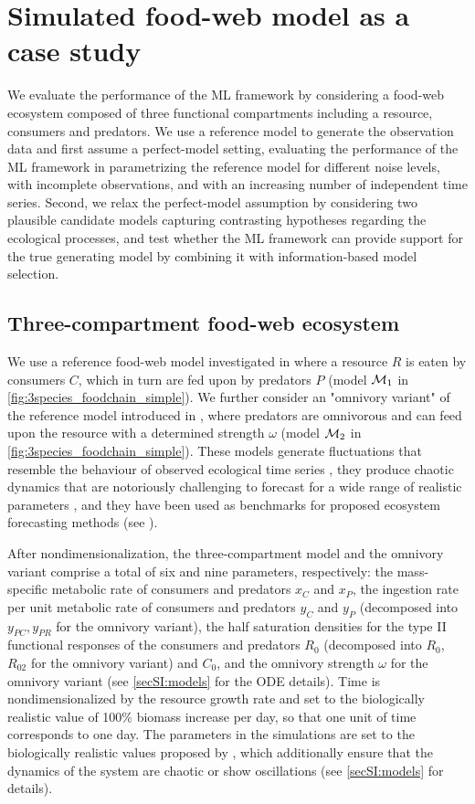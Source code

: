 \section{Simulated food-web model as a case study}\label{sec:numerical_simulations}

We evaluate the performance of the ML framework by considering a food-web ecosystem composed of three functional compartments including a resource, consumers and predators. 
%
We use a reference model to generate the observation data and first assume a perfect-model setting, evaluating the performance of the ML framework in parametrizing the reference model for different noise levels, with incomplete observations, and with an increasing number of independent time series.
%
Second, we relax the perfect-model assumption by considering two plausible candidate models capturing contrasting hypotheses regarding the ecological processes, and test whether the ML framework can provide support for the true generating model by combining it with information-based model selection.

\subsection{Three-compartment food-web ecosystem}
We use a reference food-web model investigated in \citep{Hastings1991,McCann1994a,McCann1994,Klebanoff1994} where a resource $R$ is eaten by consumers $C$, which in turn are fed upon by predators $P$ (model $\mathcal{M}_1$ in \cref{fig:3species_foodchain_simple}). We further consider an "omnivory variant" of the reference model introduced in \citep{McCann1997}, where predators are omnivorous and can feed upon the resource with a determined strength $\omega$ (model $\mathcal{M}_2$ in \cref{fig:3species_foodchain_simple}). 
%
These models generate fluctuations that resemble the behaviour of observed ecological time series \citep{Bjornstad2001}, they produce chaotic dynamics that are notoriously challenging to forecast for a wide range of realistic parameters \citep{Post2000}, and they have been used as benchmarks for proposed ecosystem forecasting methods (see \citep{Perretti2013,Deyle2016,Ye2016}). 
 
After nondimensionalization, the three-compartment model and the omnivory variant comprise a total of six and nine parameters, respectively: the mass-specific metabolic rate of consumers and predators $x_C$ and $x_P$, the ingestion rate per unit metabolic rate of consumers and predators $y_C$ and $y_P$ (decomposed into $y_{PC}, y_{PR}$ for the omnivory variant), the half saturation densities for the type II functional responses of the consumers and predators $R_0$ (decomposed into $R_0$, $R_{02}$ for the omnivory variant) and $C_0$, and the omnivory strength $\omega$ for the omnivory variant (see \cref{secSI:models} for the ODE details). 
%
Time is nondimensionalized by the resource growth rate and set to the biologically realistic value of 100\% biomass increase per day, so that one unit of time corresponds to one day. The parameters in the simulations are set to the biologically realistic values proposed by \citep{McCann1994,McCann1997}, which additionally ensure that the dynamics of the system are chaotic or show oscillations (see \cref{secSI:models} for details).

